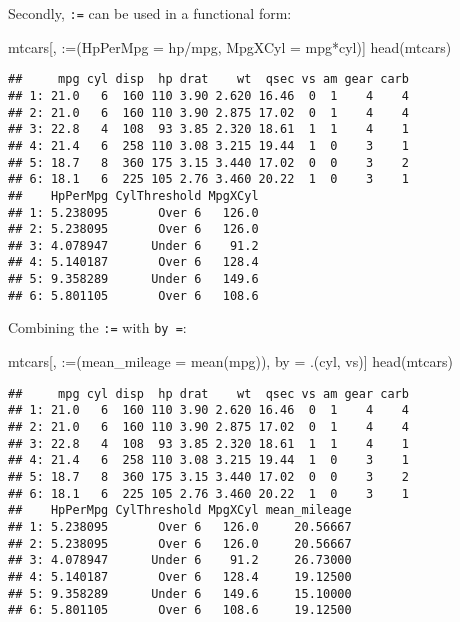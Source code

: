 \documentclass[
]{book}
\newenvironment{Shaded}{\begin{snugshade}}{\end{snugshade}}
\newcommand{\AttributeTok}[1]{\textcolor[rgb]{0.77,0.63,0.00}{#1}}
\newcommand{\FunctionTok}[1]{\textcolor[rgb]{0.00,0.00,0.00}{#1}}
\newcommand{\NormalTok}[1]{#1}
\newcommand{\OtherTok}[1]{\textcolor[rgb]{0.56,0.35,0.01}{#1}}
\newcommand{\SpecialCharTok}[1]{\textcolor[rgb]{0.00,0.00,0.00}{#1}}
\newcommand{\StringTok}[1]{\textcolor[rgb]{0.31,0.60,0.02}{#1}}
\begin{document}
Secondly, \texttt{:=} can be used in a functional form:

\begin{Shaded}
\begin{Highlighting}[]
\NormalTok{mtcars[, }\StringTok{\textasciigrave{}}\AttributeTok{:=}\StringTok{\textasciigrave{}}\NormalTok{(}\AttributeTok{HpPerMpg =}\NormalTok{ hp}\SpecialCharTok{/}\NormalTok{mpg, }\AttributeTok{MpgXCyl =}\NormalTok{ mpg}\SpecialCharTok{*}\NormalTok{cyl)]}
\FunctionTok{head}\NormalTok{(mtcars)}
\end{Highlighting}
\end{Shaded}

\begin{verbatim}
##     mpg cyl disp  hp drat    wt  qsec vs am gear carb
## 1: 21.0   6  160 110 3.90 2.620 16.46  0  1    4    4
## 2: 21.0   6  160 110 3.90 2.875 17.02  0  1    4    4
## 3: 22.8   4  108  93 3.85 2.320 18.61  1  1    4    1
## 4: 21.4   6  258 110 3.08 3.215 19.44  1  0    3    1
## 5: 18.7   8  360 175 3.15 3.440 17.02  0  0    3    2
## 6: 18.1   6  225 105 2.76 3.460 20.22  1  0    3    1
##    HpPerMpg CylThreshold MpgXCyl
## 1: 5.238095       Over 6   126.0
## 2: 5.238095       Over 6   126.0
## 3: 4.078947      Under 6    91.2
## 4: 5.140187       Over 6   128.4
## 5: 9.358289      Under 6   149.6
## 6: 5.801105       Over 6   108.6
\end{verbatim}

Combining the \texttt{:=} with \texttt{by\ =}:

\begin{Shaded}
\begin{Highlighting}[]
\NormalTok{mtcars[, }\StringTok{\textasciigrave{}}\AttributeTok{:=}\StringTok{\textasciigrave{}}\NormalTok{(}\AttributeTok{mean\_mileage =} \FunctionTok{mean}\NormalTok{(mpg)), by }\OtherTok{=}\NormalTok{ .(cyl, vs)]}
\FunctionTok{head}\NormalTok{(mtcars)}
\end{Highlighting}
\end{Shaded}

\begin{verbatim}
##     mpg cyl disp  hp drat    wt  qsec vs am gear carb
## 1: 21.0   6  160 110 3.90 2.620 16.46  0  1    4    4
## 2: 21.0   6  160 110 3.90 2.875 17.02  0  1    4    4
## 3: 22.8   4  108  93 3.85 2.320 18.61  1  1    4    1
## 4: 21.4   6  258 110 3.08 3.215 19.44  1  0    3    1
## 5: 18.7   8  360 175 3.15 3.440 17.02  0  0    3    2
## 6: 18.1   6  225 105 2.76 3.460 20.22  1  0    3    1
##    HpPerMpg CylThreshold MpgXCyl mean_mileage
## 1: 5.238095       Over 6   126.0     20.56667
## 2: 5.238095       Over 6   126.0     20.56667
## 3: 4.078947      Under 6    91.2     26.73000
## 4: 5.140187       Over 6   128.4     19.12500
## 5: 9.358289      Under 6   149.6     15.10000
## 6: 5.801105       Over 6   108.6     19.12500
\end{verbatim}
\end{document}

